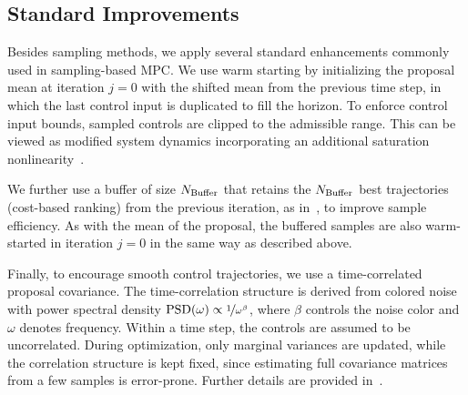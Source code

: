 \subsection{Standard Improvements}
\label{sec:standard_improvements}

Besides sampling methods, we apply several standard enhancements commonly used in sampling-based \ac{MPC}.
We use warm starting by initializing the proposal mean at iteration $j = 0$ with the shifted mean from the previous time step, in which the last control input is duplicated to fill the horizon.
%
To enforce control input bounds, sampled controls are clipped to the admissible range. This can be viewed as modified system dynamics incorporating an additional saturation nonlinearity~\cite{williamsInformationtheoretic2018}.

We further use a buffer of size $N_{\mathrm{Buffer}}$ that retains the $N_{\mathrm{Buffer}}$ best trajectories (cost-based ranking) from the previous iteration, as in~\cite{walkerSampleefficientSmoothCrossentropy2026,arXiv26_Walker_IFAC}, to improve sample efficiency. 
As with the mean of the proposal, the buffered samples are also warm-started in iteration $j = 0$ in the same way as described above.

Finally, to encourage smooth control trajectories, we use a time-correlated proposal covariance.
The time-correlation structure is derived from colored noise with power spectral density $\mathrm{PSD}(\omega) \propto \nicefrac{1}{\omega^{\beta}}$, where $\beta$ controls the noise color and $\omega$ denotes frequency. Within a time step, the controls are assumed to be uncorrelated.
During optimization, only marginal variances are updated, while the correlation structure is kept fixed, since estimating full covariance matrices from a few samples is error-prone.
Further details are provided in~\cite{arXiv26_Walker_IFAC}.